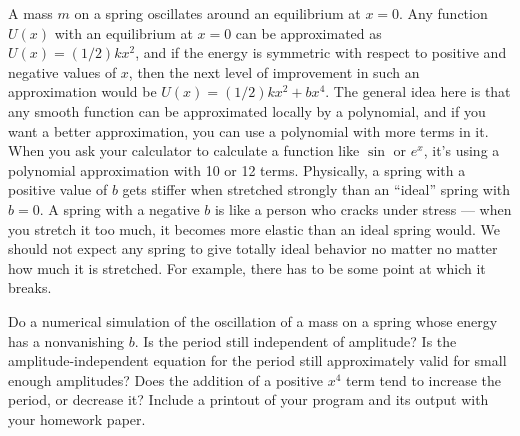         A mass $m$ on a spring oscillates around an equilibrium at $x=0$. Any function $U(x)$
        with an equilibrium at $x=0$ can be approximated as  $U(x)=(1/2)kx^2$,
        and if the energy
        is symmetric with respect to positive and negative values of $x$, then the next
        level of improvement in such an approximation would be $U(x)=(1/2)kx^2+bx^4$.
        The general idea here is that any smooth function
        can be approximated locally by a polynomial, and if you want a better approximation,
        you can use a polynomial with more terms in it. When you ask your calculator
        to calculate a function like $\sin$ or $e^x$, it's using a polynomial approximation
        with 10 or 12 terms. Physically,
        a spring with a positive value of $b$ gets stiffer when stretched strongly
        than an ``ideal'' spring with $b=0$. A spring with a negative $b$ is like a person
        who cracks under stress --- when you stretch it too much, it becomes more elastic
        than an ideal spring would. We should not expect any spring to give totally ideal
        behavior no matter no matter how much it is stretched. For example, there has to be
        some point at which it breaks.

        Do a numerical simulation of the oscillation of a mass on a spring whose
         energy has a nonvanishing $b$. Is the
        period still independent of amplitude? Is the amplitude-independent equation
        for the period still approximately valid for small enough amplitudes? Does the
        addition of a positive $x^4$ term tend to increase the period, or decrease it?
        Include a printout of your program and its output with your homework paper.
